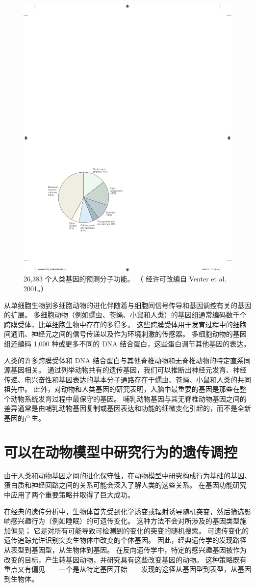 \begin{figure}[htbp]
	\centering
	\includegraphics[width=0.5\linewidth]{chap02/fig_2_6}
	\caption{26,383 个人类基因的预测分子功能。 （
		经许可改编自 Venter et al. 2001。）}
	\label{fig:2_6}
\end{figure}


从单细胞生物到多细胞动物的进化伴随着与细胞间信号传导和基因调控有关的基因的扩展。 
多细胞动物（例如蠕虫、苍蝇、小鼠和人类）的基因组通常编码数千个跨膜受体，比单细胞生物中存在的多得多。 
这些跨膜受体用于发育过程中的细胞间通讯、神经元之间的信号传递以及作为环境刺激的传感器。 
多细胞动物的基因组还编码 1,000 种或更多不同的 DNA 结合蛋白，这些蛋白调节其他基因的表达。


人类的许多跨膜受体和 DNA 结合蛋白与其他脊椎动物和无脊椎动物的特定直系同源基因相关。 
通过列举动物共有的遗传基因，我们可以推断出神经元发育、神经传递、电兴奋性和基因表达的基本分子通路存在于蠕虫、苍蝇、小鼠和人类的共同祖先中。 
此外，对动物和人类基因的研究表明，人脑中最重要的基因是那些在整个动物系统发育过程中最保守的基因。 
哺乳动物基因与其无脊椎动物基因之间的差异通常是由哺乳动物基因复制或基因表达和功能的细微变化引起的，而不是全新基因的产生。


\section{可以在动物模型中研究行为的遗传调控}
由于人类和动物基因之间的进化保守性，在动物模型中研究构成行为基础的基因、蛋白质和神经回路之间的关系可能会深入了解人类的这些关系。 
在基因功能研究中应用了两个重要策略并取得了巨大成功。


在经典的遗传分析中，生物体首先受到化学诱变或辐射诱导随机突变，然后筛选影响感兴趣行为（例如睡眠）的可遗传变化。 
这种方法不会对所涉及的基因类型施加偏见； 
它是对所有可能导致可检测到的变化的突变的随机搜索。 
可遗传变化的遗传追踪允许识别突变生物体中改变的个体基因。 
因此，经典遗传学的发现路径从表型到基因型，从生物体到基因。 
在反向遗传学中，特定的感兴趣基因被作为改变的目标，产生转基因动物，并研究具有这些改变基因的动物。 
这种策略既有重点又有偏见——一个是从特定基因开始——发现的途径从基因型到表型，从基因到生物体。


